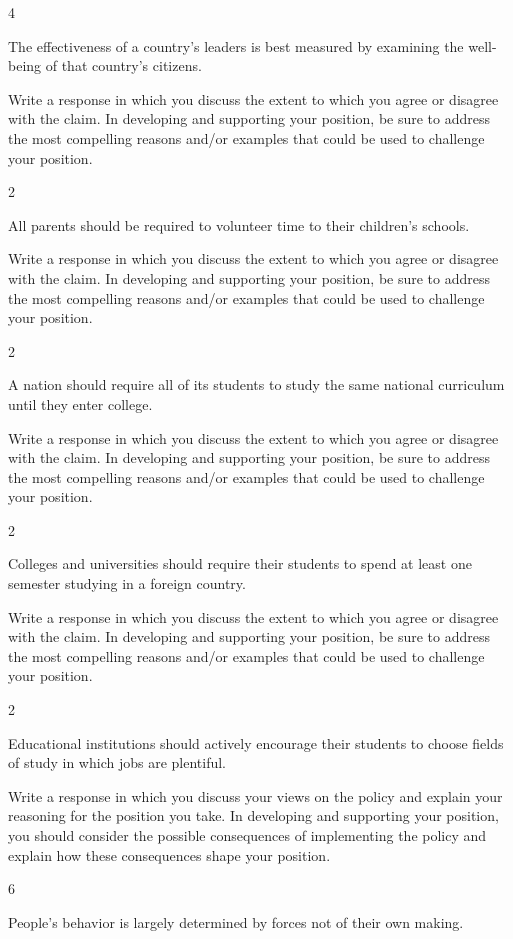 \documentclass[]{article}
\begin{document}
4

The effectiveness of a country's leaders is best measured by examining
the well-being of that country's citizens.

Write a response in which you discuss the extent to which you agree or
disagree with the claim. In developing and supporting your position, be
sure to address the most compelling reasons and/or examples that could
be used to challenge your position.

2

All parents should be required to volunteer time to their children's
schools.

Write a response in which you discuss the extent to which you agree or
disagree with the claim. In developing and supporting your position, be
sure to address the most compelling reasons and/or examples that could
be used to challenge your position.

2

A nation should require all of its students to study the same national
curriculum until they enter college.

Write a response in which you discuss the extent to which you agree or
disagree with the claim. In developing and supporting your position, be
sure to address the most compelling reasons and/or examples that could
be used to challenge your position.

2

Colleges and universities should require their students to spend at
least one semester studying in a foreign country.

Write a response in which you discuss the extent to which you agree or
disagree with the claim. In developing and supporting your position, be
sure to address the most compelling reasons and/or examples that could
be used to challenge your position.

2

Educational institutions should actively encourage their students to
choose fields of study in which jobs are plentiful.

Write a response in which you discuss your views on the policy and
explain your reasoning for the position you take. In developing and
supporting your position, you should consider the possible consequences
of implementing the policy and explain how these consequences shape your
position.

6

People's behavior is largely determined by forces not of their own
making.
\end{document}
